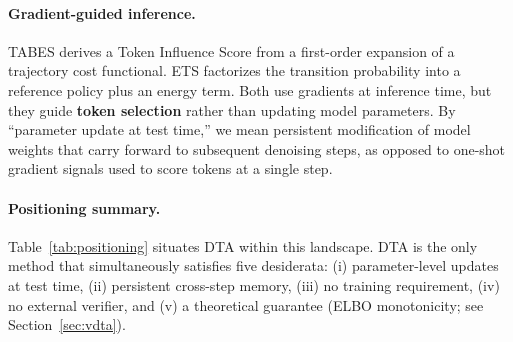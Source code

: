 \documentclass{article}
\begin{document}
\paragraph{Gradient-guided inference.} TABES \citep{tabes2026} derives a Token Influence Score from a first-order expansion of a trajectory cost functional. ETS \citep{ets2026} factorizes the transition probability into a reference policy plus an energy term. Both use gradients at inference time, but they guide \textbf{token selection} rather than updating model parameters. By ``parameter update at test time,'' we mean persistent modification of model weights that carry forward to subsequent denoising steps, as opposed to one-shot gradient signals used to score tokens at a single step.

\paragraph{Positioning summary.} Table~\ref{tab:positioning} situates DTA within this landscape. DTA is the only method that simultaneously satisfies five desiderata: (i) parameter-level updates at test time, (ii) persistent cross-step memory, (iii) no training requirement, (iv) no external verifier, and (v) a theoretical guarantee (ELBO monotonicity; see Section~\ref{sec:vdta}).
\end{document}
